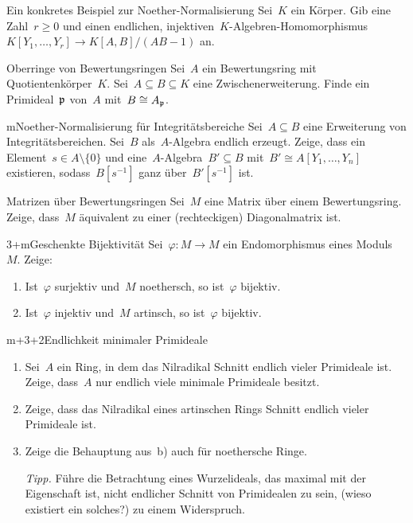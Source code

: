 \documentclass{uebblatt}
\begin{document}

\begin{aufgabe}{4}{Ein konkretes Beispiel zur Noether-Normalisierung}
Sei~$K$ ein Körper. Gib eine Zahl~$r \geq 0$ und einen endlichen,
injektiven~$K$-Algebren-Homomorphismus~$K[Y_1,\ldots,Y_r] \to K[A,B]/(AB-1)$
an.
\end{aufgabe}

\begin{aufgabe}{3}{Oberringe von Bewertungsringen}
Sei~$A$ ein Bewertungsring mit Quotientenkörper~$K$. Sei~$A \subseteq B
\subseteq K$ eine Zwischenerweiterung. Finde ein Primideal~$\mathfrak{p}$ von~$A$
mit~$B \cong A_{\mathfrak{p}}$.
\end{aufgabe}

\begin{aufgabe}{m}{Noether-Normalisierung für Integritätsbereiche}
Sei~$A \subseteq B$ eine Erweiterung von Integritätsbereichen. Sei~$B$
als~$A$-Algebra endlich erzeugt. Zeige, dass ein Element~$s \in A \setminus
\{0\}$ und eine~$A$-Algebra~$B' \subseteq B$ mit~$B' \cong A[Y_1,\ldots,Y_n]$
existieren, sodass~$B[s^{-1}]$ ganz über~$B'[s^{-1}]$ ist.
\end{aufgabe}

\begin{aufgabe}{2}{Matrizen über Bewertungsringen}
Sei~$M$ eine Matrix über einem Bewertungsring. Zeige, dass~$M$ äquivalent zu
einer (recht\-eckigen) Diagonalmatrix ist.
\end{aufgabe}

\begin{aufgabe}{3+m}{Geschenkte Bijektivität}
Sei~$\varphi : M \to M$ ein Endomorphismus eines Moduls~$M$. Zeige:
\begin{enumerate}
\item Ist~$\varphi$ surjektiv und~$M$ noethersch, so ist~$\varphi$ bijektiv.
\item Ist~$\varphi$ injektiv und~$M$ artinsch, so ist~$\varphi$ bijektiv.
\end{enumerate}
\end{aufgabe}

\begin{aufgabe}{m+3+2}{Endlichkeit minimaler Primideale}
\begin{enumerate}
\item Sei~$A$ ein Ring, in dem das Nilradikal Schnitt endlich vieler Primideale
ist. Zeige, dass~$A$ nur endlich viele minimale Primideale besitzt.
\item Zeige, dass das Nilradikal eines artinschen Rings Schnitt
endlich vieler Primideale ist.
\item Zeige die Behauptung aus~b) auch für noethersche Ringe.

{\scriptsize\emph{Tipp.} Führe die Betrachtung eines Wurzelideals, das maximal
mit der Eigenschaft ist, nicht endlicher Schnitt von Primidealen zu sein, (wieso
existiert ein solches?) zu einem Widerspruch.\par}
\end{enumerate}
\end{aufgabe}
\end{document}

